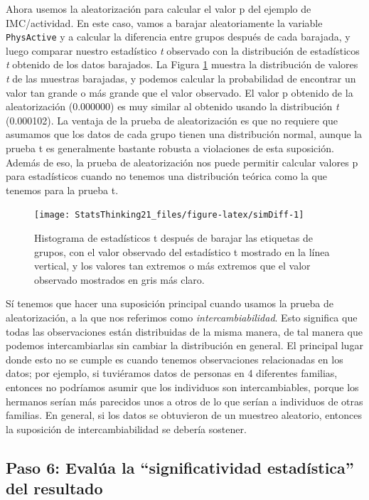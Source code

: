 \documentclass[
  12pt,
]{book}
\begin{document}
Ahora usemos la aleatorización para calcular el valor p del ejemplo de IMC/actividad. En este caso, vamos a barajar aleatoriamente la variable \texttt{PhysActive} y a calcular la diferencia entre grupos después de cada barajada, y luego comparar nuestro estadístico \emph{t} observado con la distribución de estadísticos \emph{t} obtenido de los datos barajados. La Figura \ref{fig:simDiff} muestra la distribución de valores \emph{t} de las muestras barajadas, y podemos calcular la probabilidad de encontrar un valor tan grande o más grande que el valor observado. El valor p obtenido de la aleatorización (0.000000) es muy similar al obtenido usando la distribución \emph{t} (0.000102). La ventaja de la prueba de aleatorización es que no requiere que asumamos que los datos de cada grupo tienen una distribución normal, aunque la prueba t es generalmente bastante robusta a violaciones de esta suposición. Además de eso, la prueba de aleatorización nos puede permitir calcular valores p para estadísticos cuando no tenemos una distribución teórica como la que tenemos para la prueba t.

\begin{figure}
\texttt{[image: StatsThinking21\_files/figure-latex/simDiff-1]} \caption{Histograma de estadísticos t después de barajar las etiquetas de grupos, con el valor observado del estadístico t mostrado en la línea vertical, y los valores tan extremos o más extremos que el valor observado mostrados en gris más claro.}\label{fig:simDiff}
\end{figure}

Sí tenemos que hacer una suposición principal cuando usamos la prueba de aleatorización, a la que nos referimos como \emph{intercambiabilidad}. Esto significa que todas las observaciones están distribuidas de la misma manera, de tal manera que podemos intercambiarlas sin cambiar la distribución en general. El principal lugar donde esto no se cumple es cuando tenemos observaciones relacionadas en los datos; por ejemplo, si tuviéramos datos de personas en 4 diferentes familias, entonces no podríamos asumir que los individuos son intercambiables, porque los hermanos serían más parecidos unos a otros de lo que serían a individuos de otras familias. En general, si los datos se obtuvieron de un muestreo aleatorio, entonces la suposición de intercambiabilidad se debería sostener.

\hypertarget{paso-6-evaluxfaa-la-significatividad-estaduxedstica-del-resultado}{%
\subsection{Paso 6: Evalúa la ``significatividad estadística'' del resultado}\label{paso-6-evaluxfaa-la-significatividad-estaduxedstica-del-resultado}}
\end{document}
